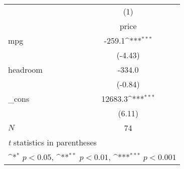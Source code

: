 {
\def\sym#1{\ifmmode^{#1}\else\(^{#1}\)\fi}
\begin{tabular}{l*{1}{c}}
\hline\hline
            &\multicolumn{1}{c}{(1)}\\
            &\multicolumn{1}{c}{price}\\
\hline
mpg         &      -259.1\sym{***}\\
            &     (-4.43)         \\
[1em]
headroom    &      -334.0         \\
            &     (-0.84)         \\
[1em]
\_cons      &     12683.3\sym{***}\\
            &      (6.11)         \\
\hline
\(N\)       &          74         \\
\hline\hline
\multicolumn{2}{l}{\footnotesize \textit{t} statistics in parentheses}\\
\multicolumn{2}{l}{\footnotesize \sym{*} \(p<0.05\), \sym{**} \(p<0.01\), \sym{***} \(p<0.001\)}\\
\end{tabular}
}

